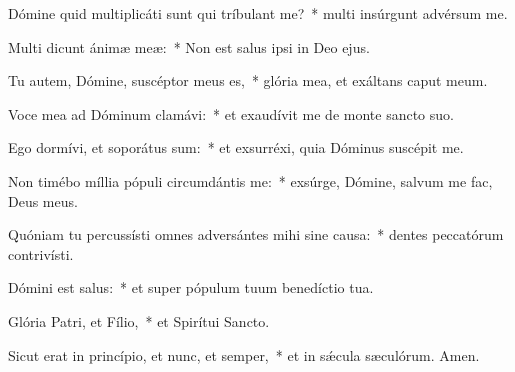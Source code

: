 \item Dómine quid multiplicáti sunt qui tríbulant me?~* multi insúrgunt advérsum me.

\item Multi dicunt ánimæ meæ:~* Non est salus ipsi in Deo ejus.

\item Tu autem, Dómine, suscéptor meus es,~* glória mea, et exáltans caput meum.

\item Voce mea ad Dóminum clamávi:~* et exaudívit me de monte sancto suo.

\item Ego dormívi, et soporátus sum:~* et exsurréxi, quia Dóminus suscépit me.

\item Non timébo míllia pópuli circumdántis me:~* exsúrge, Dómine, salvum me fac, Deus meus.

\item Quóniam tu percussísti omnes adversántes mihi sine causa:~* dentes peccatórum contrivísti.

\item Dómini est salus:~* et super pópulum tuum benedíctio tua.

\item Glória Patri, et Fílio,~* et Spirítui Sancto.

\item Sicut erat in princípio, et nunc, et semper,~* et in sǽcula sæculórum. Amen.

